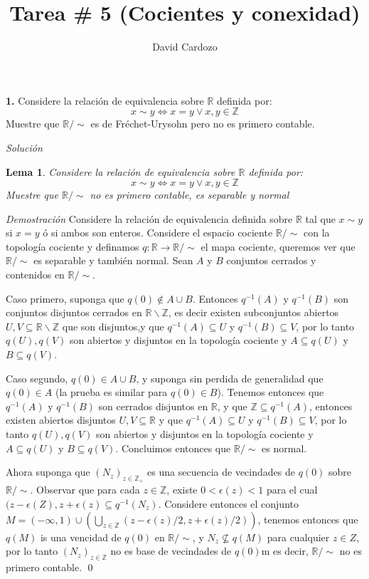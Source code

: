 \documentclass[]{article}
\author{David Cardozo}
\title{Tarea \# 5 (Cocientes y conexidad)}
\newtheorem{lem}{Lema}
\newcommand{\RR}{\mathbb{R}}
\newcommand{\ZZ}{\mathbb{Z}}
\newcommand{\qt}[1]{\textrm{#1}}
\newcommand{\function}[3]{#1 : #2 \rightarrow #3}
\newcommand{\contained}{\subseteq}
\begin{document}
	
\maketitle

\textbf{1.} Considere la relación de equivalencia sobre $ \RR $ definida por:
\[ x \sim y \iff x = y \vee x,y \in \ZZ \]
Muestre que $ \RR / \sim  $ es de Fréchet-Urysohn pero no es primero contable.

\textit{Solución}

\begin{lem}
	Considere la relación de equivalencia sobre $ \RR $ definida por:
	\[ x \sim y \iff x = y \vee x,y \in \ZZ \]
	Muestre que $ \RR / \sim  $ no es primero contable, es separable y normal
\end{lem}

\textit{Demostración}
Considere la relación de equivalencia definida sobre $ \RR $ tal que $ x \sim y $ si $ x=y  $ ó si ambos son enteros. Considere el espacio cociente $ \RR / \sim $
con la topología cociente y definamos $ \function{q}{\RR}{\RR / \sim} $ el mapa cociente, queremos ver que $ \RR / \sim $ es separable y también normal. Sean $A$ y $B$ conjuntos cerrados y contenidos en $ \RR / \sim  $.

Caso primero, suponga que $ q(0) \not\in A \cup B $. Entonces $ q^{-1}(A) $ y $ q^{-1}(B) $ son conjuntos disjuntos cerrados en $ \RR \backslash \ZZ  $, es decir existen subconjuntos abiertos $ U,V \contained \RR \backslash \ZZ $ que son  disjuntos,y que $ q^{-1}(A) \contained U $ y $ q^{-1}(B) \contained V $, por lo tanto $ q(U), q(V) $ son abiertos y disjuntos en la topología cociente y $ A \contained q(U)$ y $ B \contained q(V) $.

Caso segundo, $ q(0) \in A \cup B $, y suponga sin perdida de generalidad que $ q(0) \in A $ (la prueba es similar para $ q(0) \in B $). Tenemos entonces que $ q^{-1}(A) \qt{ y } q^{-1}(B) $ son cerrados disjuntos en $ \RR $, y que $ \ZZ \contained q^{-1}(A) $, entonces existen abiertos disjuntos $ U,V \contained \RR $ y que $ q^{-1}(A) \contained U $ y $ q^{-1}(B) \contained V $, por lo tanto $ q(U), q(V) $ son abiertos y disjuntos en la topología cociente y $ A \contained q(U)$ y $ B \contained q(V) $. Concluimos entonces que $ \RR / \sim $ es normal.

Ahora suponga que $ (N_z)_{z\in \ZZ_+} $ es una secuencia de vecindades de $ q(0)  $ sobre $  \RR / \sim  $. Observar que para cada $ z \in \ZZ $, existe $ 0< \epsilon(z) < 1 $ para el cual $ (z-\epsilon(Z),z+\epsilon(z) \contained q^{-1}(N_z)$. Considere entonces el conjunto $ M = (-\infty, 1) \cup (\bigcup_{z \in \ZZ} (z - \epsilon(z)/2, z + \epsilon(z)/2)) $, tenemos entonces que $ q(M) $ is una vencidad de $ q(0) $ en $ \RR / \sim $, y $ N_z \not \contained q(M) $ para cualquier $ z \in Z $, por lo tanto $ (N_z)_{z \in \ZZ} $
no es base de vecindades de $ q(0) $m es decir, $ \RR / \sim $ no es primero contable. \qed
\end{document}
